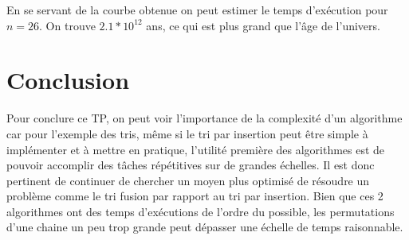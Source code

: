 \documentclass[12pt]{article}
\begin{document}
En se servant de la courbe obtenue on peut estimer le temps d'exécution pour $n=26$. On trouve $2.1*10^{12}$ ans, ce qui est plus grand que l'âge de l'univers.

\newpage
\section{Conclusion}
Pour conclure ce TP, on peut voir l'importance de la complexité d'un algorithme car pour l'exemple des tris, même si le tri par insertion peut être simple à implémenter et à mettre en pratique, l'utilité première des algorithmes est de pouvoir accomplir des tâches répétitives sur de grandes échelles.
Il est donc pertinent de continuer de chercher un moyen plus optimisé de résoudre un problème comme le tri fusion  par rapport au tri par insertion. Bien que ces 2 algorithmes ont des temps d'exécutions de l'ordre du possible, les permutations d'une chaine un peu trop grande peut dépasser une échelle de temps raisonnable.
\end{document}
